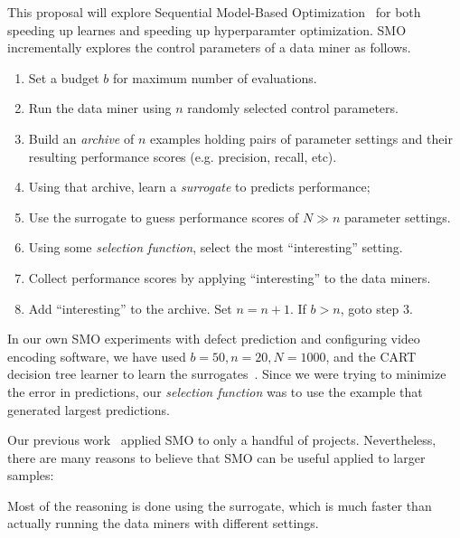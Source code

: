 This proposal will explore Sequential Model-Based Optimization~\cite{Bergstra:2011} for both speeding up learnes and speeding
up hyperparamter optimization.
SMO  incrementally explores the control parameters of a data miner as follows.
\begin{enumerate}
\item Set a budget $b$ for maximum number of evaluations.
\item
Run the data miner using $n$ randomly selected control parameters.
\item Build an {\em archive} of  $n$   examples holding pairs of  parameter settings and   their resulting performance scores
(e.g. precision, recall, etc).
\item
Using that archive, learn a {\em surrogate}   to predicts performance;
\item Use the surrogate to guess  performance scores of 
$N \gg n$ parameter settings.
\item Using some {\em selection  function}, select  the most ``interesting'' setting. 
\item Collect performance scores by applying    ``interesting'' to the data miners. 
\item  Add  ``interesting'' to the archive. Set $n=n+1$. If $b>n$, goto step 3.
\end{enumerate}
In our own SMO  experiments with defect prediction and configuring video encoding software, we have used $b=50,n=20, N=1000$, and the CART
decision tree learner to learn the surrogates~\cite{nair18tse}. Since we were trying to minimize the error in predictions,
our {\em selection function} was to use the example that generated largest predictions.

Our previous work~\cite{nair18tse} applied SMO to only a handful
of projects. Nevertheless, there are many reasons to believe
that SMO can be useful applied to   larger samples:
\bi
\item
Most of the reasoning is done using the surrogate, which is much faster than actually running the data miners with different settings.

